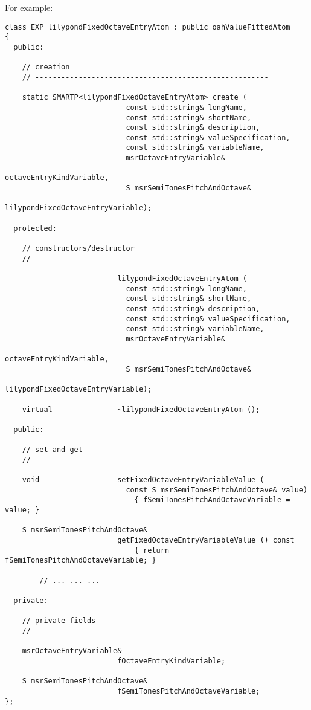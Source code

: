 For example:
\begin{lstlisting}[language=CPlusPlus]
class EXP lilypondFixedOctaveEntryAtom : public oahValueFittedAtom
{
  public:

    // creation
    // ------------------------------------------------------

    static SMARTP<lilypondFixedOctaveEntryAtom> create (
                            const std::string& longName,
                            const std::string& shortName,
                            const std::string& description,
                            const std::string& valueSpecification,
                            const std::string& variableName,
                            msrOctaveEntryVariable&
                                               octaveEntryKindVariable,
                            S_msrSemiTonesPitchAndOctave&
                                               lilypondFixedOctaveEntryVariable);

  protected:

    // constructors/destructor
    // ------------------------------------------------------

                          lilypondFixedOctaveEntryAtom (
                            const std::string& longName,
                            const std::string& shortName,
                            const std::string& description,
                            const std::string& valueSpecification,
                            const std::string& variableName,
                            msrOctaveEntryVariable&
                                               octaveEntryKindVariable,
                            S_msrSemiTonesPitchAndOctave&
                                               lilypondFixedOctaveEntryVariable);

    virtual               ~lilypondFixedOctaveEntryAtom ();

  public:

    // set and get
    // ------------------------------------------------------

    void                  setFixedOctaveEntryVariableValue (
                            const S_msrSemiTonesPitchAndOctave& value)
                              { fSemiTonesPitchAndOctaveVariable = value; }

    S_msrSemiTonesPitchAndOctave&
                          getFixedOctaveEntryVariableValue () const
                              { return fSemiTonesPitchAndOctaveVariable; }

		// ... ... ...

  private:

    // private fields
    // ------------------------------------------------------

    msrOctaveEntryVariable&
                          fOctaveEntryKindVariable;

    S_msrSemiTonesPitchAndOctave&
                          fSemiTonesPitchAndOctaveVariable;
};
\end{lstlisting}

